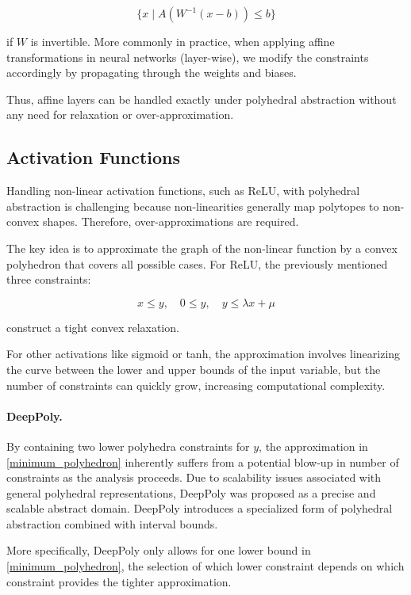 \documentclass[oneside,11pt,dvipsnames]{book}
\numberwithin{equation}{section}
\theoremstyle{definition}
\theoremstyle{remark}
\begin{document}
\[
\{x \mid A (W^{-1}(x - b)) \leq b\}
\]

if \(W\) is invertible. More commonly in practice, when applying affine transformations in neural networks (layer-wise), we modify the constraints accordingly by propagating through the weights and biases.

Thus, affine layers can be handled exactly under polyhedral abstraction without any need for relaxation or over-approximation.

\subsection{Activation Functions}

Handling non-linear activation functions, such as ReLU, with polyhedral abstraction is challenging because non-linearities generally map polytopes to non-convex shapes. Therefore, over-approximations are required.

The key idea is to approximate the graph of the non-linear function by a convex polyhedron that covers all possible cases. For ReLU, the previously mentioned three constraints:

\begin{equation}\label{minimum_polyhedron}
x \leq y, \quad 0 \leq y, \quad y \leq \lambda x + \mu
\end{equation}


construct a tight convex relaxation.

For other activations like sigmoid or tanh, the approximation involves linearizing the curve between the lower and upper bounds of the input variable, but the number of constraints can quickly grow, increasing computational complexity.

\paragraph{DeepPoly.}  
By containing two lower polyhedra constraints for \(y\), the approximation in \ref{minimum_polyhedron} inherently suffers from a potential blow-up in number of constraints as the analysis proceeds. Due to scalability issues associated with general polyhedral representations, DeepPoly \cite{singh2019abstract} was proposed as a precise and scalable abstract domain. DeepPoly introduces a specialized form of polyhedral abstraction combined with interval bounds. 

More specifically,  DeepPoly only allows for one lower bound in \ref{minimum_polyhedron}, the selection of which lower constraint depends on which constraint provides the tighter approximation.
\end{document}
